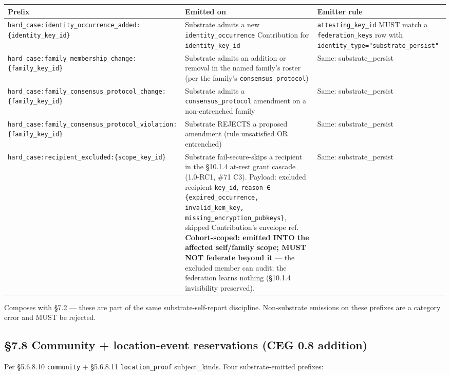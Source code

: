 \documentclass[10pt]{article}
\begin{document}
{\footnotesize
\begin{longtable}{|p{5.33cm}|p{5.33cm}|p{5.33cm}|}\hline
\textbf{Prefix} & \textbf{Emitted on} & \textbf{Emitter rule} \\ \hline\endhead
\texttt{hard\_case:identity\_occurrence\_added:\{identity\_key\_id\}} & Substrate admits a new \texttt{identity\_occurrence} Contribution for \texttt{identity\_key\_id} & \texttt{attesting\_key\_id} MUST match a \texttt{federation\_keys} row with \texttt{identity\_type="substrate\_persist"} \\ \hline
\texttt{hard\_case:family\_membership\_change:\{family\_key\_id\}} & Substrate admits an addition or removal in the named family's roster (per the family's \texttt{consensus\_protocol}) & Same: substrate\_persist \\ \hline
\texttt{hard\_case:family\_consensus\_protocol\_change:\{family\_key\_id\}} & Substrate admits a \texttt{consensus\_protocol} amendment on a non-entrenched family & Same: substrate\_persist \\ \hline
\texttt{hard\_case:family\_consensus\_protocol\_violation:\{family\_key\_id\}} & Substrate REJECTS a proposed amendment (rule unsatisfied OR entrenched) & Same: substrate\_persist \\ \hline
\texttt{hard\_case:recipient\_excluded:\{scope\_key\_id\}} & Substrate fail-secure-skips a recipient in the §10.1.4 at-rest grant cascade (1.0-RC1, \#71 C3). Payload: excluded recipient \texttt{key\_id}, \texttt{reason ∈ \{expired\_occurrence, invalid\_kem\_key, missing\_encryption\_pubkeys\}}, skipped Contribution's envelope ref. \textbf{Cohort-scoped: emitted INTO the affected self/family scope; MUST NOT federate beyond it} — the excluded member can audit; the federation learns nothing (§10.1.4 invisibility preserved). & Same: substrate\_persist \\ \hline
\end{longtable}}


Composes with §7.2 — these are part of the same substrate-self-report discipline. Non-substrate emissions on these prefixes are a category error and MUST be rejected.


\subsection*{§7.8 Community + location-event reservations (CEG 0.8 addition)}


Per §5.6.8.10 \texttt{community} + §5.6.8.11 \texttt{location\_proof} subject\_kinds. Four substrate-emitted prefixes:
\end{document}
